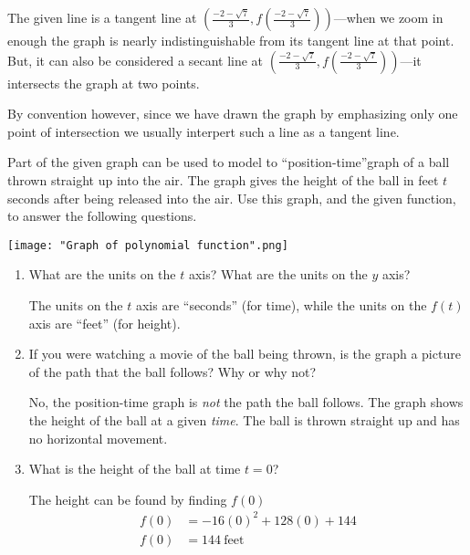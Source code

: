 \documentclass[nooutcomes]{ximera}
\begin{document}
\begin{problem}
\begin{enumerate}
\begin{freeResponse}
        The given line is a tangent line at  $\left(\frac{-2-\sqrt{7}}{3},f\left(\frac{-2-\sqrt{7}}{3}\right)\right)$---when we zoom in enough the graph is nearly indistinguishable from its tangent line at that point.
        But, it can also be considered a secant line at  $\left(\frac{-2-\sqrt{7}}{3},f\left(\frac{-2-\sqrt{7}}{3}\right)\right)$---it intersects the graph at two points.

        By convention however, since we have drawn the graph by emphasizing only one point of intersection we usually interpert such a line as a tangent line.
	      \end{freeResponse}
	\end{enumerate}

\end{problem}

\begin{problem}
 Part of the given graph can be used to model to ``position-time''graph of a ball thrown straight up into the air.  The graph gives the height of the ball in feet $t$ seconds after being released into the air.
  Use this graph, and the given function, to answer the following questions.
  \begin{image}
    \texttt{[image: "Graph of polynomial function".png]}
  \end{image}
	
	
		\begin{enumerate}
			
		 \item  What are the units on the $t$ axis?  What are the units on the $y$ axis?
		 \begin{freeResponse}		 
	The units on the $t$ axis are ``seconds'' (for time), while the units on the $f(t)$ axis are ``feet'' (for height).        
		\end{freeResponse}
			
		\item  If you were watching a movie of the ball being thrown, is the graph a picture of the path that the ball follows?  Why or why not?
		\begin{freeResponse}		 
	 No, the position-time graph is \emph{not} the path the ball follows.
        The graph shows the height of the ball at a given \emph{time}.
        The ball is thrown straight up and has no horizontal movement.
		\end{freeResponse}
	
		\item What is the height of the ball at time $t=0$?
		\begin{freeResponse}
		The height can be found by finding $f(0)$
		\begin{align*}
			f(0)&=-16(0)^2+128(0)+144 \\
			f(0)&=144\  \text{feet}
 			\end{align*}


\end{freeResponse}
\end{enumerate}
\end{problem}
\end{document}
